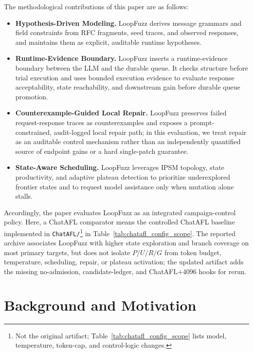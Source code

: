 \documentclass[final,5p,times,number]{elsarticle}
\begin{document}
The methodological contributions of this paper are as follows:
\begin{itemize}
    \item \textbf{Hypothesis-Driven Modeling.} LoopFuzz derives message grammars and field constraints from RFC fragments, seed traces, and observed responses, and maintains them as explicit, auditable runtime hypotheses.
    \item \textbf{Runtime-Evidence Boundary.} LoopFuzz inserts a runtime-evidence boundary between the LLM and the durable queue. It checks structure before trial execution and uses bounded execution evidence to evaluate response acceptability, state reachability, and downstream gain before durable queue promotion.
    \item \textbf{Counterexample-Guided Local Repair.} LoopFuzz preserves failed request-response traces as counterexamples and exposes a prompt-constrained, audit-logged local repair path; in this evaluation, we treat repair as an auditable control mechanism rather than an independently quantified source of endpoint gains or a hard single-patch guarantee.
    \item \textbf{State-Aware Scheduling.} LoopFuzz leverages IPSM topology, state productivity, and adaptive plateau detection to prioritize underexplored frontier states and to request model assistance only when mutation alone stalls.
\end{itemize}

Accordingly, the paper evaluates LoopFuzz as an integrated campaign-control policy. Here, a ChatAFL comparator means the controlled ChatAFL baseline implemented in \texttt{ChatAFL/}\footnote{Not the original artifact; Table~\ref{tab:chatafl_config_scope} lists model, temperature, token-cap, and control-logic changes.} in Table~\ref{tab:chatafl_config_scope}. The reported archive associates LoopFuzz with higher state exploration and branch coverage on most primary targets, but does not isolate $P/U/R/G$ from token budget, temperature, scheduling, repair, or plateau activation; the updated artifact adds the missing no-admission, candidate-ledger, and ChatAFL+4096 hooks for rerun.

\section{Background and Motivation}
\end{document}
